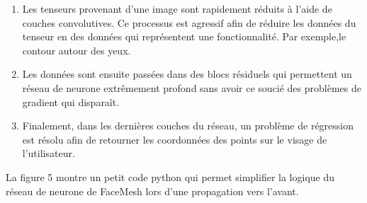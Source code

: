 \documentclass{rapportbrebeuf}
\begin{document}
\begin{enumerate}
    \item Les tenseurs provenant d'une image sont rapidement réduits à l'aide de couches convolutives. Ce processus est agressif afin de réduire les données du tenseur en des données qui représentent une fonctionnalité. Par exemple,le contour autour des yeux.
    \item Les données sont ensuite passées dans des blocs résiduels qui permettent un réseau de neurone extrêmement profond sans avoir ce soucié des problèmes de gradient qui disparaît.
    \item Finalement, dans les dernières couches du réseau, un problème de régression est résolu afin de retourner les coordonnées des points sur le visage de l'utilisateur.
\end{enumerate}

\lstset{style=mystyle}
\usetikzlibrary{calc, positioning, shapes.geometric, arrows.meta, fit, backgrounds}

La figure 5 montre un petit code python qui permet simplifier la logique du réseau de neurone de FaceMesh lors d'une propagation vers l'avant.
\end{document}
